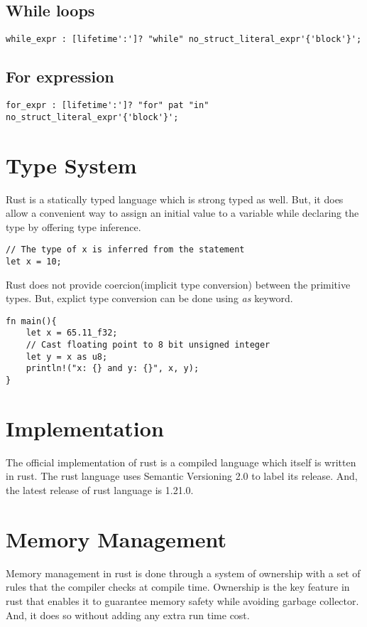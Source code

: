 \documentclass[12pt, titlepage]{article}
\begin{document}
\subsection{While loops}
\begin{lstlisting}
while_expr : [lifetime':']? "while" no_struct_literal_expr'{'block'}';
\end{lstlisting}

\subsection{For expression}
\begin{lstlisting}
for_expr : [lifetime':']? "for" pat "in" no_struct_literal_expr'{'block'}';
\end{lstlisting}

\section{Type System}
Rust is a statically typed language which is strong typed\cite{RustIntro} as well. But, it does allow a convenient way to
assign an initial value to a variable while declaring the type by offering type inference.

\begin{lstlisting}
// The type of x is inferred from the statement
let x = 10;
\end{lstlisting}

Rust does not provide coercion(implicit type conversion) between the primitive types. But, explict type conversion can
be done using \textit{as} keyword.

\begin{lstlisting}
fn main(){
    let x = 65.11_f32;
    // Cast floating point to 8 bit unsigned integer
    let y = x as u8;
    println!("x: {} and y: {}", x, y);
}
\end{lstlisting}

\section{Implementation}
The official implementation of rust is a compiled language which itself is written in rust. The rust
language uses Semantic Versioning 2.0\cite{SemVer} to label its release. And, the latest release of rust language is 1.21.0\cite{Rust1.21}.

\section{Memory Management}
Memory management in rust is done through a system of ownership with a set of rules that the
compiler checks at compile time. Ownership is the key feature in rust that enables it to
guarantee memory safety while avoiding garbage collector. And, it does so without adding any extra run time cost\cite{RustOwnership}.
\end{document}
